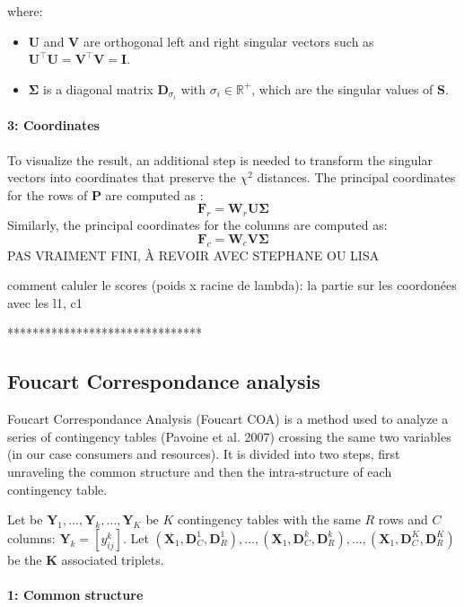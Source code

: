 where:
\begin{itemize}
    \item $\mathbf{U}$ and $\mathbf{V}$ are orthogonal left and right singular vectors such as $\mathbf{U}^\intercal\mathbf{U} = \mathbf{V}^\intercal\mathbf{V} = \mathbf{I}$.
    \item  $\mathbf{\Sigma}$ is a diagonal matrix $\mathbf{D}_{\sigma_i}$ with $\sigma_i \in \mathbb{R}^+$, which are the singular values of $\mathbf{S}$.
\end{itemize}


\paragraph{3: Coordinates}

To visualize the result, an additional step is needed to transform the singular vectors into coordinates that preserve the $\chi^2$ distances. The principal coordinates for the rows of $\mathbf{P}$ are computed as :
$$
    \mathbf{F}_r = \mathbf{W}_r \mathbf{U} \mathbf{\Sigma}
$$
Similarly, the principal coordinates for the columns are computed as:
$$
    \mathbf{F}_c = \mathbf{W}_c \mathbf{V} \mathbf{\Sigma}
$$ 
PAS VRAIMENT FINI, À REVOIR AVEC STEPHANE OU LISA

comment caluler le scores (poids x racine de lambda): la partie sur les coordonées avec les l1, c1

*******************************


\subsection{Foucart Correspondance analysis}

Foucart Correspondance Analysis (Foucart COA) is a method used to analyze a series of contingency tables (Pavoine et al. 2007) crossing the same two variables (in our case consumers and resources).
It is divided into two steps, first unraveling the common structure and then the intra-structure of each contingency table.

Let be $\mathbf{Y}_1, \ldots, \mathbf{Y}_k, \ldots, \mathbf{Y}_K$ be $K$ contingency tables with the same $R$ rows and $C$ columns: $\mathbf{Y}_k = [y_{ij}^k]$. 
Let $(\mathbf{X}_1, \mathbf{D}_C^1, \mathbf{D}_R^1), \ldots, (\mathbf{X}_1, \mathbf{D}_C^k, \mathbf{D}_R^k), \ldots, (\mathbf{X}_1, \mathbf{D}_C^K, \mathbf{D}_R^K)$ be the $\mathbf{K}$ associated triplets.

\paragraph{1: Common structure}

